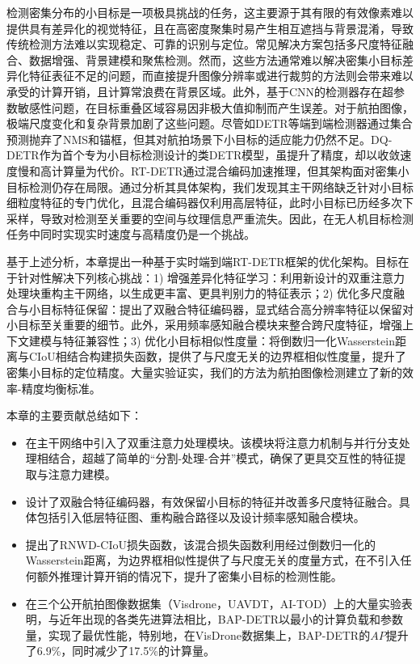 检测密集分布的小目标是一项极具挑战的任务，这主要源于其有限的有效像素难以提供具有差异化的视觉特征，且在高密度聚集时易产生相互遮挡与背景混淆，导致传统检测方法难以实现稳定、可靠的识别与定位。常见解决方案包括多尺度特征融合\cite{张洋:165,Singh2017SNIP}、数据增强\cite{kisantal2019augmentation}、背景建模\cite{Li2025RethinkingSparseMask}和聚焦检测\cite{Yang2019ClusteredOD}。然而，这些方法通常难以解决密集小目标差异化特征表征不足的问题，而直接提升图像分辨率或进行裁剪的方法则会带来难以承受的计算开销，且计算常浪费在背景区域。此外，基于CNN的检测器存在超参数敏感性问题，在目标重叠区域容易因非极大值抑制而产生误差\cite{Tan2024UAVAerialDetection}。对于航拍图像，极端尺度变化和复杂背景加剧了这些问题。尽管如DETR\cite{Carion2020DETR}等端到端检测器通过集合预测抛弃了NMS和锚框，但其对航拍场景下小目标的适应能力仍然不足。DQ-DETR\cite{Huang2024DQDETR}作为首个专为小目标检测设计的类DETR模型，虽提升了精度，却以收敛速度慢和高计算量为代价。RT-DETR\cite{Lv2024RtDETRv2}通过混合编码加速推理，但其架构面对密集小目标检测仍存在局限。通过分析其具体架构，我们发现其主干网络缺乏针对小目标细粒度特征的专门优化，且混合编码器仅利用高层特征，此时小目标已历经多次下采样，导致对检测至关重要的空间与纹理信息严重流失。因此，在无人机目标检测任务中同时实现实时速度与高精度仍是一个挑战。

基于上述分析，本章提出一种基于实时端到端RT-DETR框架的优化架构。目标在于针对性解决下列核心挑战：1) 增强差异化特征学习：利用新设计的双重注意力处理块重构主干网络，以生成更丰富、更具判别力的特征表示；2) 优化多尺度融合与小目标特征保留：提出了双融合特征编码器，显式结合高分辨率特征以保留对小目标至关重要的细节。此外，采用频率感知融合模块来整合跨尺度特征，增强上下文建模与特征兼容性；3) 优化小目标相似性度量：将倒数归一化Wasserstein距离与CIoU相结合构建损失函数，提供了与尺度无关的边界框相似性度量，提升了密集小目标的定位精度。大量实验证实，我们的方法为航拍图像检测建立了新的效率-精度均衡标准。

本章的主要贡献总结如下：
\begin{itemize}
\item 在主干网络中引入了双重注意力处理模块。该模块将注意力机制与并行分支处理相结合，超越了简单的“分割-处理-合并”模式，确保了更具交互性的特征提取与注意力建模。
\item 设计了双融合特征编码器，有效保留小目标的特征并改善多尺度特征融合。具体包括引入低层特征图、重构融合路径以及设计频率感知融合模块。
\item 提出了RNWD-CIoU损失函数，该混合损失函数利用经过倒数归一化的Wasserstein距离，为边界框相似性提供了与尺度无关的度量方式，在不引入任何额外推理计算开销的情况下，提升了密集小目标的检测性能。
\item 在三个公开航拍图像数据集（Visdrone\cite{Cao2021VisDroneDET2021}，UAVDT\cite{Du2018UAVDT}，AI-TOD\cite{Wang2021AITOD}）上的大量实验表明，与近年出现的各类先进算法相比，BAP-DETR以最小的计算负载和参数量，实现了最优性能，特别地，在VisDrone数据集上，BAP-DETR的$AP$提升了6.9\%，同时减少了17.5\%的计算量。
\end{itemize}

